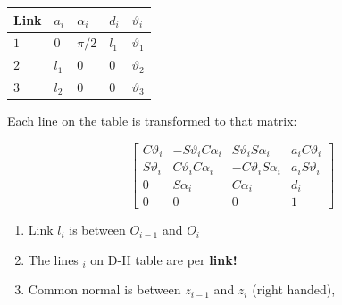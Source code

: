\documentclass{article}
\begin{document}
\begin{table}[h!]
    \begin{tabular}{|l|l|l|l|l|}
        \hline
        Link & $a_i$   & $\alpha_i$ & $d_i$  & $\vartheta_i$ \\ \hline
        $1$  &  $0$    &    $\pi/2$ &  $l_1$ & $\vartheta_1$ \\ \hline
        $2$  &  $l_1$  &    $0$     &  $0$   & $\vartheta_2$ \\ \hline
        $3$  &  $l_2$  &    $0$     &  $0$   & $\vartheta_3$ \\ \hline
\end{tabular}
\end{table}

Each line on the table is transformed to that matrix:

    \begin{equation*}
        \begin{bmatrix}
        C\vartheta_i &  -S\vartheta_i C\alpha_i &  S\vartheta_i S\alpha_i &  a_i C\vartheta_i\\
        S\vartheta_i & C\vartheta_i C\alpha_i   & -C\vartheta_i S\alpha_i & a_i S\vartheta_i \\
        0            & S\alpha_i                & C\alpha_i               & d_i              \\
        0            & 0                        & 0                       & 1
        \end{bmatrix}
    \end{equation*}


\begin{enumerate}
    \item Link $l_i$ is between $O_{i-1}$ and  $O_{i}$ 
    \item The lines $_i$ on D-H table are per \textbf{link!}
    \item Common normal is between $z_{i-1}$ and $z_{i}$ (right handed),
        
\end{enumerate}
\end{document}
